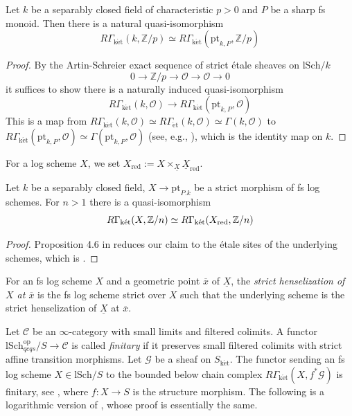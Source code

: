 \documentclass[10pt]{amsart}
\newcommand{\Z}{\mathbb{Z}}
\newcommand{\cC}{\mathcal{C}}
\newcommand{\cG}{\mathcal{G}}
\newcommand{\cO}{\mathcal{O}}
\newcommand{\ul}{\underline}
\newcommand{\ol}{\overline}
\newcommand{\ket}{\mathrm{k\acute{e}t}}
\newcommand{\et}{\mathrm{\acute{e}t}}
\newcommand{\lSch}{\mathrm{lSch}}
\newcommand{\pt}{\mathrm{pt}}
\begin{document}
\begin{lemma}
\label{lem:no log point}
Let $k$ be a separably closed field of characteristic $p>0$ and $P$ be a sharp fs monoid.
Then there is a natural quasi-isomorphism
\[
R\Gamma_\ket(k,\Z/p)
\simeq
R\Gamma_\ket(\pt_{k,P},\Z/p)
\]
\end{lemma}
\begin{proof}
By the Artin-Schreier exact sequence of strict \'etale sheaves on $\lSch/k$
\[
0
\to
\Z/p
\to
\cO
\to
\cO
\to
0
\]
it suffices to show there is a naturally induced quasi-isomorphism
\[
R\Gamma_\ket(k,\cO)
\to
R\Gamma_\ket(\pt_{k,P},\cO)
\]
This is a map from $R\Gamma_\ket(k,\cO)\simeq R\Gamma_\et(k,\cO)\simeq \Gamma(k,\cO)$ to 
$R\Gamma_\ket(\pt_{k,P},\cO)\simeq \Gamma(\pt_{k,P},\cO)$ (see, e.g., \cite[Corollary 3.26]{MR2452875}),
which is the identity map on $k$.
\end{proof}

For a log scheme $X$,
we set $X_\mathrm{red}:=X\times_{\ul{X}}\ul{X}_\mathrm{red}$.

\begin{lemma}\label{lem:reduced}
Let $k$ be a separably closed field,
$X\to \pt_{P.k}$ be a strict morphism of fs log schemes.
For $n>1$ there is a quasi-isomorphism
$$R\Gamma_{\ket}(X, \Z/n)\simeq R\Gamma_{\ket}(X_{\textnormal{red}}, \Z/n)$$
\end{lemma}
\begin{proof}
Proposition 4.6 in \cite{MR1457738} reduces our claim to the étale sites of the 
underlying schemes, which is \cite[Théorème IV.18.1.2]{EGA}.
\end{proof}

For an fs log scheme $X$ and a geometric point $\ol{x}$ of $\ul{X}$,
the \emph{strict henselization of $X$ at $\ol{x}$} is the fs log scheme strict over $X$ 
such that the underlying scheme is the strict henselization of $\ul{X}$ at $\ol{x}$.

Let $\cC$ be an $\infty$-category with small limits and filtered colimits.
A functor $\lSch^{\text{op}}_{qcqs}/S \to \cC$ is called \emph{finitary} 
if it preserves small filtered colimits with strict affine transition morphisms.
Let $\cG$ be a sheaf on $S_\ket.$
The functor sending an fs log scheme $X \in \lSch/S$ to the bounded below chain complex 
$R\Gamma_{\ket}(X, f^*\cG)$ is finitary, see \cite[Lemma 4.2]{MR1457738},
where $f\colon X\to S$ is the structure morphism.
The following is a logarithmic version of \cite[Lemma 5.1]{MR4278670}, 
whose proof is essentially the same.
\end{document}
